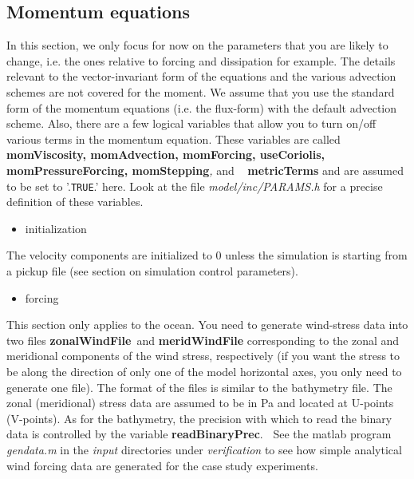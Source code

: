 \subsection{Momentum equations}

In this section, we only focus for now on the parameters that you are likely
to change, i.e. the ones relative to forcing and dissipation for example.
The details relevant to the vector-invariant form of the equations and the
various advection schemes are not covered for the moment. We assume that you
use the standard form of the momentum equations (i.e. the flux-form) with
the default advection scheme. Also, there are a few logical variables that
allow you to turn on/off various terms in the momentum equation. These
variables are called \textbf{momViscosity, momAdvection, momForcing,
useCoriolis, momPressureForcing, momStepping}\textit{, }and \textit{\ }%
\textbf{metricTerms }and are assumed to be set to '.\texttt{TRUE}.' here.
Look at the file \textit{model/inc/PARAMS.h }for a precise definition of
these variables.

\begin{itemize}
\item initialization
\end{itemize}

The velocity components are initialized to 0 unless the simulation is
starting from a pickup file (see section on simulation control parameters).

\begin{itemize}
\item forcing
\end{itemize}

This section only applies to the ocean. You need to generate wind-stress
data into two files \textbf{zonalWindFile}\textit{\ }and \textbf{%
meridWindFile }corresponding to the zonal and meridional components of the
wind stress, respectively (if you want the stress to be along the direction
of only one of the model horizontal axes, you only need to generate one
file). The format of the files is similar to the bathymetry file. The zonal
(meridional) stress data are assumed to be in Pa and located at U-points
(V-points). As for the bathymetry, the precision with which to read the
binary data is controlled by the variable \textbf{readBinaryPrec}.\textbf{\ }
See the matlab program \textit{gendata.m }in the \textit{input }directories
under \textit{verification }to see how simple analytical wind forcing data
are generated for the case study experiments. 

